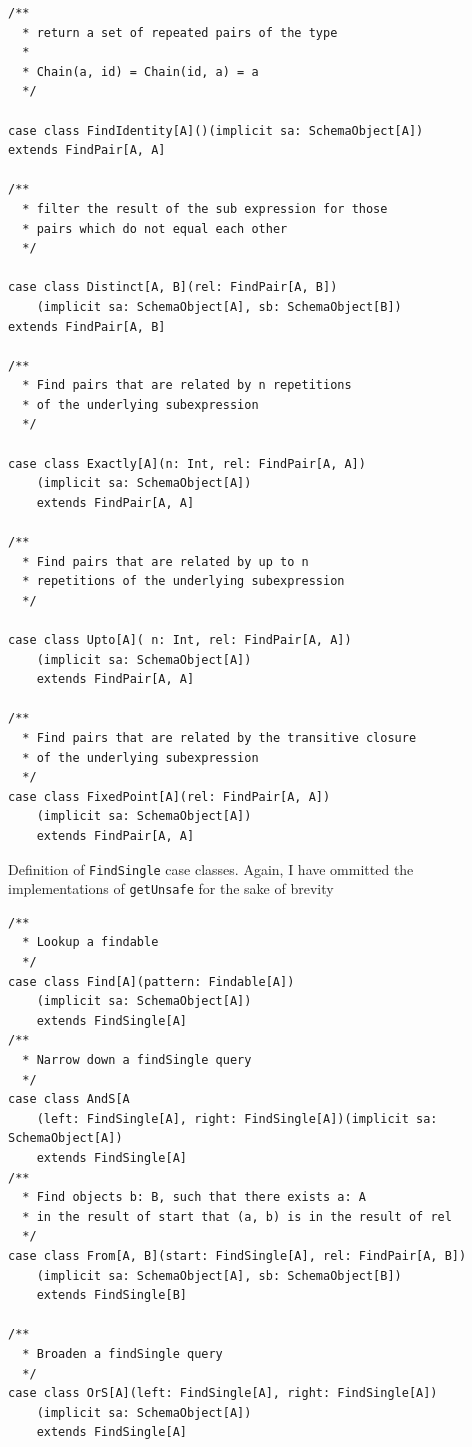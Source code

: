 \documentclass[12pt,a4paper,twoside,openright]{report}
\newcommand\codeName[1]{\texttt{#1}}
\renewcommand{\baselinestretch}{1.1}    %
\begin{document}
\begin{framed}
\begin{verbatim}
/**
  * return a set of repeated pairs of the type
  *
  * Chain(a, id) = Chain(id, a) = a
  */

case class FindIdentity[A]()(implicit sa: SchemaObject[A])
extends FindPair[A, A]

/**
  * filter the result of the sub expression for those
  * pairs which do not equal each other
  */

case class Distinct[A, B](rel: FindPair[A, B])
    (implicit sa: SchemaObject[A], sb: SchemaObject[B])
extends FindPair[A, B]

/**
  * Find pairs that are related by n repetitions
  * of the underlying subexpression
  */

case class Exactly[A](n: Int, rel: FindPair[A, A])
    (implicit sa: SchemaObject[A])
    extends FindPair[A, A]

/**
  * Find pairs that are related by up to n
  * repetitions of the underlying subexpression
  */

case class Upto[A]( n: Int, rel: FindPair[A, A])
    (implicit sa: SchemaObject[A])
    extends FindPair[A, A]

/**
  * Find pairs that are related by the transitive closure
  * of the underlying subexpression
  */
case class FixedPoint[A](rel: FindPair[A, A])
    (implicit sa: SchemaObject[A])
    extends FindPair[A, A]

\end{verbatim}
\end{framed}
\renewcommand{\baselinestretch}{1.1}

Definition of \codeName{FindSingle} case classes. Again, I have ommitted the implementations of \codeName{getUnsafe} for the sake of brevity
\renewcommand{\baselinestretch}{0.8}
\begin{framed}
\begin{verbatim}
/**
  * Lookup a findable
  */
case class Find[A](pattern: Findable[A])
    (implicit sa: SchemaObject[A])
    extends FindSingle[A]
/**
  * Narrow down a findSingle query
  */
case class AndS[A
    (left: FindSingle[A], right: FindSingle[A])(implicit sa: SchemaObject[A])
    extends FindSingle[A]
/**
  * Find objects b: B, such that there exists a: A
  * in the result of start that (a, b) is in the result of rel
  */
case class From[A, B](start: FindSingle[A], rel: FindPair[A, B])
    (implicit sa: SchemaObject[A], sb: SchemaObject[B])
    extends FindSingle[B]

/**
  * Broaden a findSingle query
  */
case class OrS[A](left: FindSingle[A], right: FindSingle[A])
    (implicit sa: SchemaObject[A])
    extends FindSingle[A]
\end{verbatim}
\end{framed}
\renewcommand{\baselinestretch}{1.1}
\end{document}
